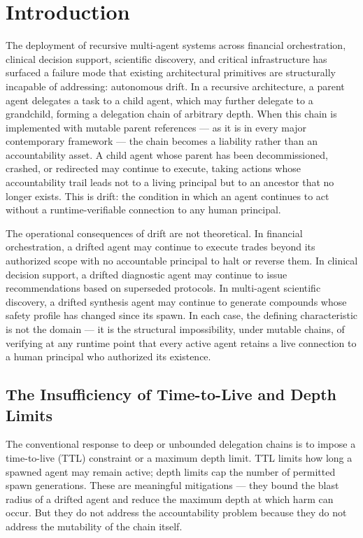 \section{Introduction}
\label{sec:introduction}

The deployment of recursive multi-agent systems across financial orchestration, clinical decision support, scientific discovery, and critical infrastructure has surfaced a failure mode that existing architectural primitives are structurally incapable of addressing: autonomous drift. In a recursive architecture, a parent agent delegates a task to a child agent, which may further delegate to a grandchild, forming a delegation chain of arbitrary depth. When this chain is implemented with mutable parent references — as it is in every major contemporary framework — the chain becomes a liability rather than an accountability asset. A child agent whose parent has been decommissioned, crashed, or redirected may continue to execute, taking actions whose accountability trail leads not to a living principal but to an ancestor that no longer exists. This is drift: the condition in which an agent continues to act without a runtime-verifiable connection to any human principal.

The operational consequences of drift are not theoretical. In financial orchestration, a drifted agent may continue to execute trades beyond its authorized scope with no accountable principal to halt or reverse them. In clinical decision support, a drifted diagnostic agent may continue to issue recommendations based on superseded protocols. In multi-agent scientific discovery, a drifted synthesis agent may continue to generate compounds whose safety profile has changed since its spawn. In each case, the defining characteristic is not the domain — it is the structural impossibility, under mutable chains, of verifying at any runtime point that every active agent retains a live connection to a human principal who authorized its existence.

\subsection{The Insufficiency of Time-to-Live and Depth Limits}
\label{sec:ttl-insufficiency}

The conventional response to deep or unbounded delegation chains is to impose a time-to-live (TTL) constraint or a maximum depth limit. TTL limits how long a spawned agent may remain active; depth limits cap the number of permitted spawn generations. These are meaningful mitigations — they bound the blast radius of a drifted agent and reduce the maximum depth at which harm can occur. But they do not address the accountability problem because they do not address the mutability of the chain itself.

